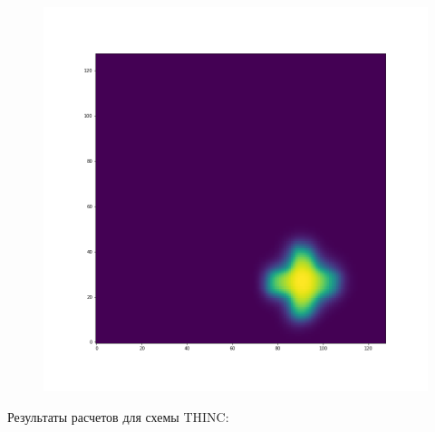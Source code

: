 \documentclass[12pt,a4paper]{article}
\begin{document}
\begin{figure}[H]
\begin{minipage}{.3\textwidth}
\end{minipage}%
\begin{minipage}{.3\textwidth}
  \centering
  \includegraphics[width=\linewidth]{Pictures/PlusRotateTestMUSCL/PlusRotateTest_t50.png}
\end{minipage}
\end{figure}

Результаты расчетов для схемы THINC:
\end{document}
